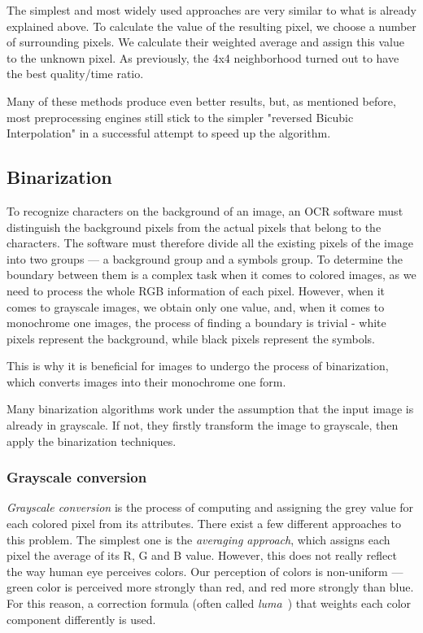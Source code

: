 The simplest and most widely used approaches are very similar to what is already explained above. To calculate the value of the resulting pixel, we choose a number of surrounding pixels. We calculate their weighted average and assign this value to the unknown pixel. As previously, the 4x4 neighborhood turned out to have the best quality/time ratio.


Many of these methods produce even better results, but, as mentioned before, most preprocessing engines still stick to the simpler "reversed Bicubic Interpolation" in a successful attempt to speed up the algorithm.

\subsection{Binarization}

To recognize characters on the background of an image, an OCR software must distinguish the background pixels from the actual pixels that belong to the characters. The software must therefore divide all the existing pixels of the image into two groups --- a background group and a symbols group. To determine the boundary between them is a complex task when it comes to colored images, as we need to process the whole RGB information of each pixel. However, when it comes to grayscale images, we obtain only one value, and, when it comes to monochrome one images, the process of finding a boundary is trivial - white pixels represent the background, while black pixels represent the symbols.

This is why it is beneficial for images to undergo the process of binarization, which converts images into their monochrome one form.

Many binarization algorithms work under the assumption that the input image is already in grayscale. If not, they firstly transform the image to grayscale, then apply the binarization techniques.

\subsubsection{Grayscale conversion}

\emph{Grayscale conversion} is the process of computing and assigning the grey value for each colored pixel from its attributes. There exist a few different approaches to this problem. The simplest one is the \emph{averaging approach}, which assigns each pixel the average of its R, G and B value. However, this does not really reflect the way human eye perceives colors. Our perception of colors is non-uniform --- green color is perceived more strongly than red, and red more strongly than blue. For this reason, a correction formula (often called \emph{luma}~\cite{grayscaleConv}) that weights each color component differently is used. 


